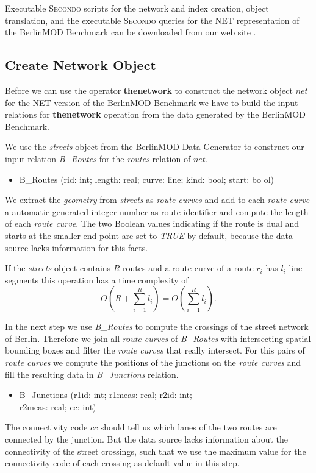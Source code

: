 \documentclass[a4paper]{article}
\newcommand{\secondo}{\textsc{Secondo}}
\newcommand{\bmodb} {BerlinMOD Benchmark}
\newcommand{\op}[1]{\textbf{#1}}
\newcommand{\true}{\textsl{TRUE}}
\begin{document}
Executable \secondo{} scripts for the network and index creation, object
translation, and the executable \secondo{} queries for the NET
representation of the \bmodb{} can be downloaded from our web site
\cite{NetworkWeb}.
\subsection{Create Network Object}
\label{sec:createNetwork}
Before we can use the operator \op{thenetwork} to construct the network object
$net$ for the NET version of the \bmodb{} we have to build the input relations
for \op{thenetwork} operation from the data generated by the \bmodb{}.

We use the \textit{streets} object from the BerlinMOD Data Generator to
construct our input relation \textit{B\_Routes} for the \textit{routes} relation of
$net$.
\begin{ttfamily}
\begin{itemize}
  \item []B\_Routes (rid: int; length: real; curve: line; kind: bool; start: bo
ol)
\end{itemize}
\end{ttfamily}
We extract the \textit{geometry} from \textit{streets} as \textit{route curves} and add to
each \textit{route curve} a automatic generated integer number as route
identifier and compute the length of each \textit{route curve}. The two Boolean
values indicating if the route is dual and starts at the smaller end point are 
set to \true{} by default, because the data source lacks information for this facts.

If the \textit{streets} object contains $R$ routes and a route curve of a route $r_i$ has
$l_i$ line segments this operation has a time complexity of
\[O(R + \sum_{i=1}^{R}{l_i}) = O(\sum_{i=1}^{R}{l_i}).\]

In the next step we use \textit{B\_Routes} to compute the crossings of the street
network of Berlin. Therefore we join all \textit{route curves} of \textit{B\_Routes} with
intersecting spatial bounding boxes and filter the \textit{route curves} that 
really intersect. For this pairs of \textit{route curves} we compute the positions 
of the junctions on the \textit{route curves} and fill the resulting data in 
\textit{B\_Junctions} relation. 
\begin{ttfamily}
\begin{itemize}
\item []B\_Junctions (r1id: int; r1meas: real; r2id: int;\\
r2meas: real; cc: int)
\end{itemize}
\end{ttfamily}
The connectivity code $cc$ should tell us which lanes of the two routes are
connected by the junction. But the data source lacks information about the
connectivity of the street crossings, such that we use the maximum value for the
connectivity code of each crossing as default value in this step. 
\end{document}
